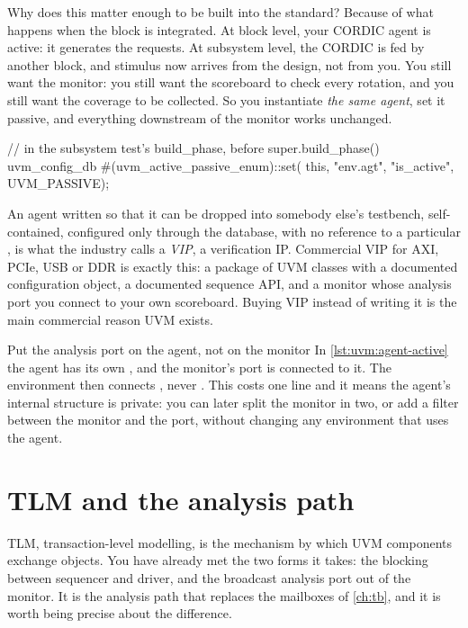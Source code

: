 Why does this matter enough to be built into the standard? Because of what
happens when the block is integrated. At block level, your CORDIC agent is
active: it generates the requests. At subsystem level, the CORDIC is fed by
another block, and stimulus now arrives from the design, not from you. You
still want the monitor: you still want the scoreboard to check every
rotation, and you still want the coverage to be collected. So you instantiate
\emph{the same agent}, set it passive, and everything downstream of the
monitor works unchanged.

\begin{uvmcode}
// in the subsystem test's build_phase, before super.build_phase()
uvm_config_db #(uvm_active_passive_enum)::set(
    this, "env.agt", "is_active", UVM_PASSIVE);
\end{uvmcode}

%
An agent written so that it can be dropped into somebody else's testbench,
self-contained, configured only through the database, with no reference to a
particular \DUT{}, is what the industry calls a \emph{VIP}, a verification
IP. Commercial VIP for AXI, PCIe, USB or DDR is exactly this: a package of
UVM classes with a documented configuration object, a documented sequence
API, and a monitor whose analysis port you connect to your own scoreboard.
Buying VIP instead of writing it is the main commercial reason UVM exists.

\begin{tipbox}{Put the analysis port on the agent, not on the monitor}
In \cref{lst:uvm:agent-active} the agent has its own , and the
monitor's port is connected to it. The environment then connects
, never . This costs one line and it means the
agent's internal structure is private: you can later split the monitor in
two, or add a filter between the monitor and the port, without changing any
environment that uses the agent.
\end{tipbox}

\section{TLM and the analysis path}
\label{sec:uvm:tlm}

%
TLM, transaction-level modelling, is the mechanism by which UVM components
exchange objects. You have already met the two forms it takes: the blocking
 between sequencer and driver, and the broadcast
analysis port out of the monitor. It is the analysis path that replaces the
mailboxes of \cref{ch:tb}, and it is worth being precise about the
difference.

